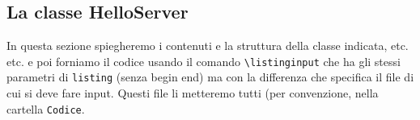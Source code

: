 \subsection{La classe HelloServer}\label{sec:esempioCodice}
In questa sezione spiegheremo i contenuti e la struttura della classe indicata, etc. etc. e poi forniamo il codice usando il comando \verb|\listinginput| che ha gli stessi parametri di \verb|listing| (senza begin end) ma con la differenza che specifica il file di cui si deve fare input. Questi file li metteremo tutti (per convenzione, nella cartella \verb|Codice|. 

